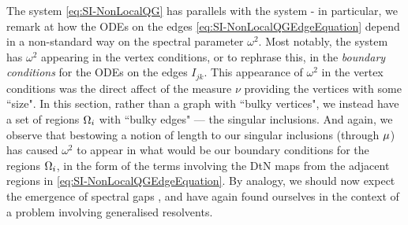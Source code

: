 The system \eqref{eq:SI-NonLocalQG} has parallels with the system  - in particular, we remark at how the ODEs on the edges \eqref{eq:SI-NonLocalQGEdgeEquation} depend in a non-standard way on the spectral parameter $\omega^2$.
Most notably, the system  has $\omega^2$ appearing in the vertex conditions, or to rephrase this, in the \emph{boundary conditions} for the ODEs on the edges $I_{jk}$.
This appearance of $\omega^2$ in the vertex conditions was the direct affect of the measure $\nu$ providing the vertices with some ``size".
In this section, rather than a graph with ``bulky vertices", we instead have a set of regions $\Omega_i$ with ``bulky edges" --- the singular inclusions.
And again, we observe that bestowing a notion of length to our singular inclusions (through $\mu$) has caused $\omega^2$ to appear in what would be our boundary conditions for the regions $\Omega_i$, in the form of the terms involving the DtN maps from the adjacent regions in \eqref{eq:SI-NonLocalQGEdgeEquation}.
By analogy, we should now expect the emergence of spectral gaps , and have again found ourselves in the context of a problem involving generalised resolvents.
